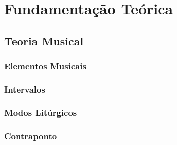 \chapter[Fundamentação Teórica]{Fundamentação Teórica}

  \section[Teoria Musical]{Teoria Musical}

    \subsection[Elementos Musicais]{Elementos Musicais}
    \subsection[Intervalos]{Intervalos}
    \subsection[Modos Litúrgicos]{Modos Litúrgicos}
    \subsection[Contraponto]{Contraponto}
